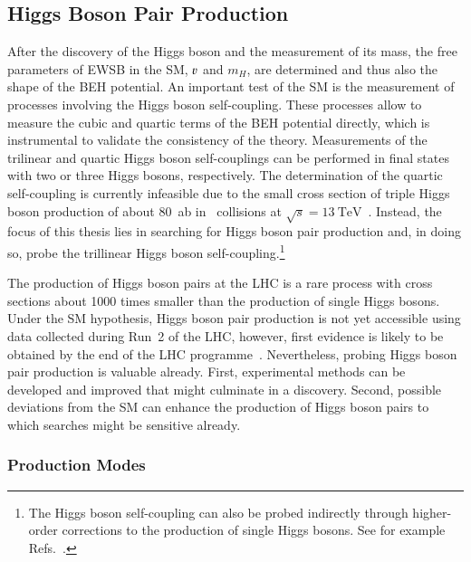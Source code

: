 \subsection{Higgs Boson Pair Production}%
\label{fig:theory_higgs_pair_prod}


After the discovery of the Higgs boson and the measurement of its mass, the free
parameters of EWSB in the SM, $\varv$ and $m_H$, are determined and thus also the
shape of the BEH potential. An important test of the SM is the measurement of
processes involving the Higgs boson self-coupling. These processes allow to
measure the cubic and quartic terms of the BEH potential directly, which is
instrumental to validate the consistency of the theory. Measurements of the
trilinear and quartic Higgs boson self-couplings can be performed in final
states with two or three Higgs bosons, respectively. The determination of the
quartic self-coupling is currently infeasible due to the small cross section of
triple Higgs boson production of about \SI{80}{\atto\barn} in \pp~collisions at
$\sqrt{s} = \SI{13}{\TeV}$~\cite{Maltoni:2014eza}. Instead, the focus of this
thesis lies in searching for Higgs boson pair production and, in doing so, probe
the trillinear Higgs boson self-coupling.\footnote{The Higgs boson self-coupling
  can also be probed indirectly through higher-order corrections to the
  production of single Higgs bosons. See for example
  Refs.~\cite{Degrassi:2016wml,ATLAS-CONF-2022-050}.}


The production of Higgs boson pairs at the LHC is a rare process with
cross sections about 1000 times smaller than the production of single Higgs
bosons. Under the SM hypothesis, Higgs boson pair production is not yet
accessible using data collected during Run~2 of the LHC, however, first evidence
is likely to be obtained by the end of the LHC
programme~\cite{ATL-PHYS-PUB-2022-005}. Nevertheless, probing Higgs boson pair
production is valuable already. First, experimental methods can be developed and
improved that might culminate in a discovery. Second, possible deviations from
the SM can enhance the production of Higgs boson pairs to which searches might
be sensitive already.


\subsubsection{Production Modes}%

